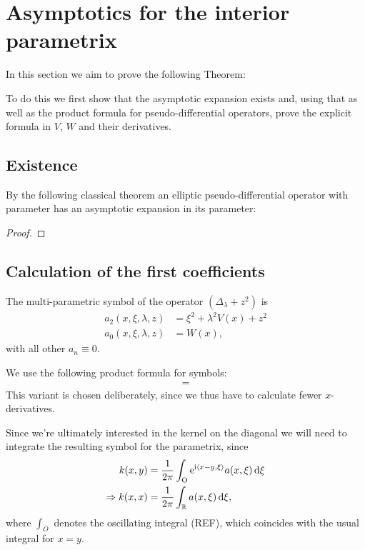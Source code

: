 \section{Asymptotics for the interior parametrix}
In this section we aim to prove the following Theorem:

To do this we first show that the asymptotic expansion exists and, using that as
well as the product formula for pseudo-differential operators, prove the
explicit formula in $V$, $W$ and their derivatives.
\subsection{Existence}
By the following classical theorem an elliptic pseudo-differential operator with
parameter has an asymptotic expansion in its parameter:

\begin{proof}
\end{proof}

\subsection{Calculation of the first coefficients}
The multi-parametric symbol of the operator $(\Delta_\lambda + z^2)$ is
\begin{align}
    a_2(x,\xi,\lambda,z) &= \xi^2 + \lambda^2 V(x) + z^2 \\
    a_0(x,\xi,\lambda,z) &= W(x),
    \label{eqn:symbol}
\end{align}
with all other $a_n \equiv 0$.

We use the following product formula for symbols:
\begin{align}
    =
    \label{eqn:product-formula}
\end{align}
This variant is chosen deliberately, since we thus have to calculate fewer
$x$-derivatives.

Since we're ultimately interested in the kernel on the diagonal we will need to
integrate the resulting symbol for the parametrix, since
\begin{align*}
    k(x,y) &= \frac{1}{2\pi}\int_{\mathrm{O}}^{} 
        \mathrm e^{\mathrm i\left\langle x-y, \xi\right\rangle} a(x,\xi)
        \,\mathrm d{\xi} \\
    \Rightarrow k(x,x) &= \frac{1}{2\pi}\int_{\mathbb{R}}^{} a(x,\xi)\,\mathrm d{\xi},
\end{align*}
where $\int_{O}$ denotes the oscillating integral (REF), which coincides with
the usual integral for $x = y$.

